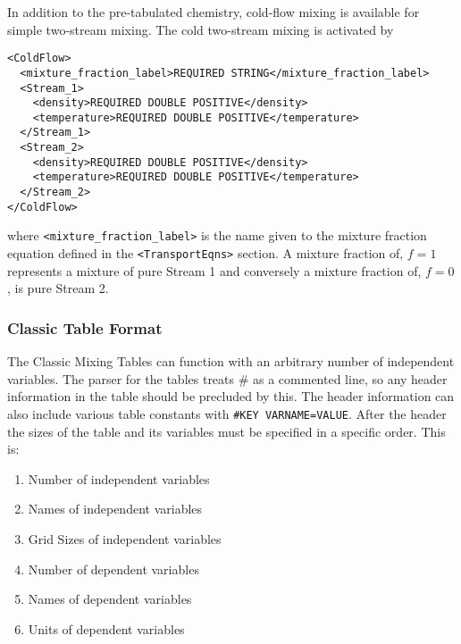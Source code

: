 In addition to the pre-tabulated chemistry, cold-flow mixing is available for simple two-stream mixing.  The cold two-stream mixing is activated by
%
\begin{Verbatim}[fontsize=\footnotesize]
<ColdFlow>
  <mixture_fraction_label>REQUIRED STRING</mixture_fraction_label>
  <Stream_1>
    <density>REQUIRED DOUBLE POSITIVE</density>
    <temperature>REQUIRED DOUBLE POSITIVE</temperature>
  </Stream_1>
  <Stream_2>
    <density>REQUIRED DOUBLE POSITIVE</density>
    <temperature>REQUIRED DOUBLE POSITIVE</temperature>
  </Stream_2>
</ColdFlow>
\end{Verbatim}
% 
where \verb=<mixture_fraction_label>= is the name given to the mixture fraction equation defined in the \verb=<TransportEqns>= section.  A mixture fraction of, $f=1$ represents a mixture of pure Stream 1 and conversely a mixture fraction of, $f=0$, is pure Stream 2.  

\subsubsection{Classic Table Format}

The Classic Mixing Tables can function with an arbitrary number of independent variables.  The parser for the tables treats \# as a commented line, so any header information in the table should be precluded by this.  The header information can also include various table constants with \verb+#KEY VARNAME=VALUE+.  After the header the sizes of the table and its variables must be specified in a specific order.  This is:

\begin{enumerate}
\item{Number of independent variables}
\item{Names of independent variables}
\item{Grid Sizes of independent variables}
\item{Number of dependent variables}
\item{Names of dependent variables}
\item{Units of dependent variables}
\end{enumerate}

